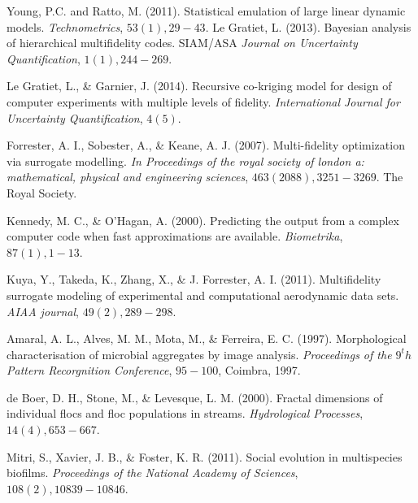 \begin{thebibliography}{94}

 Young, P.C. and Ratto, M. (2011). Statistical emulation of large linear dynamic models. {\it Technometrics}, $53(1), 29-43$.
 Le Gratiet, L. (2013). Bayesian analysis of hierarchical multifidelity codes. SIAM/ASA {\it Journal on Uncertainty Quantification}, $1(1), 244-269$.

 Le Gratiet, L., \& Garnier, J. (2014). Recursive co-kriging model for design of computer experiments with multiple levels of fidelity. {\it International Journal for Uncertainty Quantification}, $4(5).$

 Forrester, A. I., Sobester, A., \& Keane, A. J. (2007). Multi-fidelity optimization via surrogate modelling. {\it In Proceedings of the royal society of london a: mathematical, physical and engineering sciences}, $463(2088), 3251-3269$. The Royal Society.

 Kennedy, M. C., \& O'Hagan, A. (2000). Predicting the output from a complex computer code when fast approximations are available. {\it Biometrika}, $87(1), 1-13$.

 Kuya, Y., Takeda, K., Zhang, X., \& J. Forrester, A. I. (2011). Multifidelity surrogate modeling of experimental and computational aerodynamic data sets. {\it AIAA journal}, $49(2), 289-298$.


 Amaral, A. L., Alves, M. M., Mota, M., \& Ferreira, E. C. (1997). Morphological characterisation of microbial aggregates by image analysis. {\it Proceedings of the $9^th$ Pattern Recorgnition Conference}, $95-100$, Coimbra, 1997.

 de Boer, D. H., Stone, M., \& Levesque, L. M. (2000). Fractal dimensions of individual flocs and floc populations in streams. {\it Hydrological Processes}, $14(4), 653-667$.


 Mitri, S., Xavier, J. B., \& Foster, K. R. (2011). Social evolution in multispecies biofilms. {\it Proceedings of the National Academy of Sciences}, $108(2), 10839-10846$.


\end{thebibliography}

